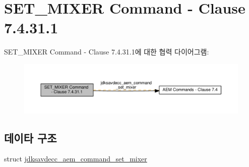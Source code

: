 \hypertarget{group__command__set__mixer}{}\section{S\+E\+T\+\_\+\+M\+I\+X\+ER Command -\/ Clause 7.4.31.1}
\label{group__command__set__mixer}
S\+E\+T\+\_\+\+M\+I\+X\+ER Command -\/ Clause 7.4.31.1에 대한 협력 다이어그램\+:
\nopagebreak
\begin{figure}[H]
\begin{center}
\leavevmode
\includegraphics[width=350pt]{group__command__set__mixer}
\end{center}
\end{figure}
\subsection*{데이타 구조}
\begin{DoxyCompactItemize}
\item 
struct \hyperlink{structjdksavdecc__aem__command__set__mixer}{jdksavdecc\+\_\+aem\+\_\+command\+\_\+set\+\_\+mixer}
\end{DoxyCompactItemize}
